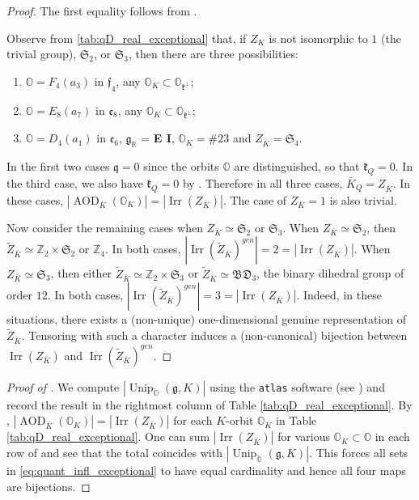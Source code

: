\documentclass[11pt, a4paper]{amsart}
\newcommand{\g}{\mathfrak{g}}
\newcommand{\orb}{\mathbb{O}}
\newcommand{\orbk}{\orb_{K}}
\newcommand{\Z}{\mathbb{Z}}
\newcommand{\fk}{\mathfrak{k}}
\newcommand{\fS}{\mathfrak{S}}
\newcommand{\ckorb}{\check{\orb}}
\DeclareMathOperator{\AOD}{AOD}
\DeclareMathOperator{\Unip}{Unip}
\newcommand{\UnipOv}{\Unip_{\ckorb}}
\newcommand{\q}{\mathfrak{q}}
\newcommand{\R}{\mathbb{R}}
\newcommand{\Irr}{\operatorname{Irr}}
\theoremstyle{definition}
\numberwithin{equation}{section}
\begin{document}
\begin{proof}
The first equality follows from . 

Observe from \cref{tab:qD_real_exceptional} that, if $Z_K$ is not isomorphic to $1$ (the trivial group), $\fS_2$, or $\fS_3$, then there are three possibilities: 
\begin{enumerate}
	\item $\orb=F_4(a_3)$ in $\mathfrak{f}_4$, any $\orbk \subset \orb_{\fk^\perp}$;
	\item $\orb=E_8(a_7)$ in $\mathfrak{e}_8$, any $\orbk \subset \orb_{\fk^\perp}$;
	\item $\orb=D_4(a_1)$ in $\mathfrak{e}_6$, $\g_\R$ = {\bf E I}, $\orbk = \#23$ and $Z_{\bar{K}} = \fS_4$.
\end{enumerate}
In the first two cases $\q = 0$ since the orbits $\orb$ are distinguished, so that $\fk_Q = 0$. In the third case, we also have $\fk_Q=0$ by \cite[Table VIII]{Djokovic:centralizer_outer}. Therefore in all three cases, $\bar{K}_Q = Z_{\bar{K}}$. In these cases, $|\AOD_{\bar{K}}(\orbk)| = |\Irr(Z_{\bar{K}})|$. The case of $Z_{\bar{K}} = 1$ is also trivial. 

Now consider the remaining cases when $Z_{\bar{K}} \simeq \fS_2$ or $\fS_3$. When $Z_{\bar{K}} \simeq \fS_2$, then $\widetilde{Z}_{\bar{K}} \simeq \Z_2 \times \fS_2$ or $\Z_4$. In both cases, $|\Irr(\widetilde{Z}_{\bar{K}})^{gen}| = 2 = |\Irr(Z_{\bar{K}})|$. When $Z_{\bar{K}} \simeq \fS_3$, then either $\widetilde{Z}_{\bar{K}} \simeq \Z_2 \times \fS_3$ or $\widetilde{Z}_{\bar{K}} \simeq \mathfrak{BD}_3$, the binary dihedral group of order $12$. In both cases, $|\Irr(\widetilde{Z}_{\bar{K}})^{gen}| = 3 = |\Irr(Z_{\bar{K}})|$. Indeed, in these situations, there exists a (non-unique) one-dimensional genuine representation of $\widetilde{Z}_{\bar{K}}$. Tensoring with such a character induces a (non-canonical) bijection between $\Irr(Z_{\bar{K}})$ and $\Irr(\widetilde{Z}_{\bar{K}})^{gen}$.
\end{proof}


\begin{proof}[Proof of ]
	We compute $|\UnipOv(\g, K)|$ using the \texttt{atlas} software (see \cite{atlas}) and record the result in the rightmost column of Table \ref{tab:qD_real_exceptional}. 
	By , $|\AOD_{\bar{K}}(\orbk)| = |\Irr(Z_{\bar{K}})|$ for each $K$-orbit $\orbk$ in Table \ref{tab:qD_real_exceptional}. One can sum $|\Irr(Z_{\bar{K}})|$ for various $\orbk \subset \orb$ in each row of  and see that the total coincides with $|\UnipOv(\g, K)|$. This forces all sets in \eqref{eq:quant_infl_exceptional} to have equal cardinality and hence all four maps are bijections.
\end{proof}
\end{document}
